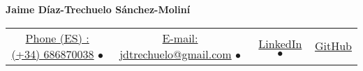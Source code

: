 \documentclass{article}
\begin{document}
    \fontsize{9}{15}
    \selectfont
    \begin{center}
        \begin{center}
            \Huge\bfseries Jaime Díaz-Trechuelo Sánchez-Moliní
        \end{center}
            \begin{tabular}{c c c c}
            \href{tel:Phone-Number}{Phone (ES) : (+34) 686870038} $\bullet$ & 
            \href{mailto:jdtrechuelo@gmail.com}{E-mail: jdtrechuelo@gmail.com} $\bullet$ & 
            \href{https://www.linkedin.com/in/jaime-díaz-trechuelo-sánchez-moliní-61727929b/}{LinkedIn}  $\bullet$ &
            \href{https://github.com/jtrechu}{GitHub}
                
        \end{tabular}
    \end{center}    
    \vspace{-0.75em}
    
    
    
    
    
    
    
 
  
\end{document}
